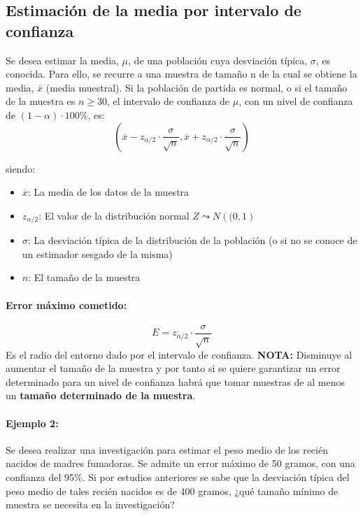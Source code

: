 \subsection{Estimación de la media por intervalo de confianza} Se desea estimar la media, $\mu$, de una población cuya desviación típica, $\sigma$, es
conocida.
Para ello, se recurre a una muestra de tamaño n de la cual se obtiene la media,
$\overline{x}$ (media muestral).
Si la población de partida es normal, o si el tamaño de la muestra es $n \geqslant 30 $, el intervalo de confianza de $\mu$, con un nivel de confianza de $\left( 1 - \alpha \right)\cdot 100 \% $, es: $$ \left( \overline{x} - z_{\alpha / 2}\cdot \frac{\sigma}{\sqrt{n}} ,  \overline{x} + z_{\alpha / 2}\cdot \frac{\sigma}{\sqrt{n}}
\right)$$

siendo: \begin{itemize}
\item $\overline{x}$: La media de los datos de la muestra
\item $z_{\alpha / 2}$: El valor de la distribución normal $Z\leadsto N\left((0,1\right)$
\item $\sigma$: La desviación típica de la distribución de la población (o si no se conoce de un estimador sesgado de la misma)
\item $n$: El tamaño de la muestra
\end{itemize}

\paragraph{Error máximo cometido:} $$E=z_{\alpha / 2}\cdot \frac{\sigma}{\sqrt{n}}$$
Es el radio del entorno dado por el intervalo de confianza. \textbf{NOTA:} Disminuye al aumentar el tamaño de la muestra y por tanto si se quiere garantizar un error determinado para un nivel de confianza habrá que tomar muestras de al menos un \textbf{tamaño determinado de la muestra}. 

\paragraph{Ejemplo 2:} Se desea realizar una investigación para estimar el peso medio de los recién nacidos de madres fumadoras. Se admite un error máximo de 50 gramos, con una confianza del 95\%. Si por estudios anteriores se sabe que la desviación típica del peso medio de tales recién nacidos es de 400 gramos, ¿qué tamaño mínimo de muestra se necesita en la investigación?\\

